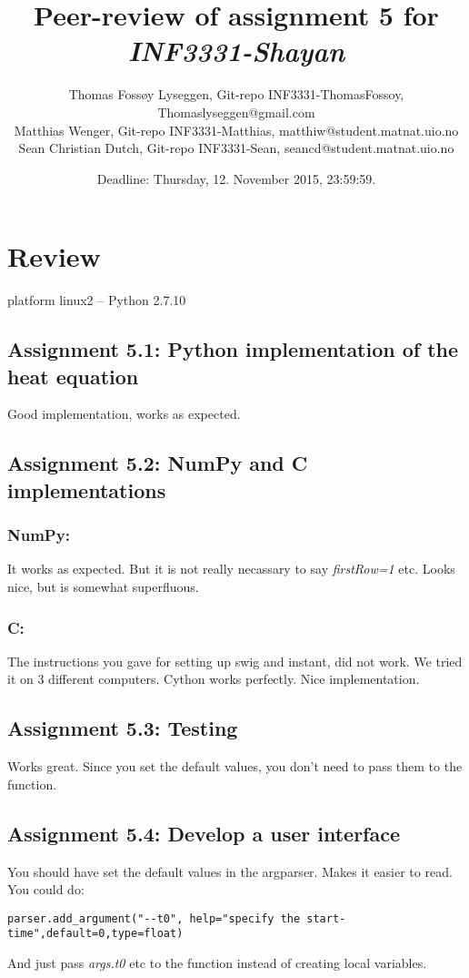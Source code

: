 \documentclass[a4paper]{article}
\title{Peer-review of assignment 5 for \textit{INF3331-Shayan}}
\author{Thomas Fossøy Lyseggen, Git-repo INF3331-ThomasFossoy, {Thomaslyseggen@gmail.com} \\
 		Matthias Wenger, Git-repo INF3331-Matthias, {matthiw@student.matnat.uio.no} \\
		Sean Christian Dutch, Git-repo INF3331-Sean, {seancd@student.matnat.uio.no}}
\date{Deadline: Thursday, 12. November 2015, 23:59:59.}
\begin{document}
\maketitle

\section{Review}\label{sec:review}

platform linux2 -- Python 2.7.10 

\subsection*{Assignment 5.1:  Python implementation of the heat equation}

Good implementation, works as expected. 

\subsection*{Assignment 5.2: NumPy and C implementations} \label{sec:assignment5.2}

\subsubsection*{NumPy:}

It works as expected. But it is not really necassary to say \emph{firstRow=1} etc. Looks nice, but is somewhat superfluous.

\subsubsection*{C:}
The instructions you gave for setting up swig and instant, did not work. We tried it on 3 different computers. Cython works perfectly. Nice implementation.

\subsection*{Assignment 5.3: Testing}

Works great. Since you set the default values, you don't need to pass them to the function.

\subsection*{Assignment 5.4:  Develop a user interface}
You should have set the default values in the argparser. Makes it easier to read. You could do:
\begin{verbatim}
parser.add_argument("--t0", help="specify the start-time",default=0,type=float)
\end{verbatim}
And just pass \emph{args.t0} etc to the function instead of creating local variables.  
\end{document}
